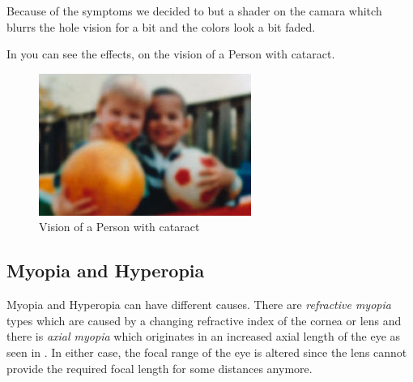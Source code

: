 \documentclass{sig-alternate-05-2015}
\begin{document}
Because of the symptoms we decided to but a shader on the camara whitch blurrs the hole vision for a bit and the colors look a bit faded.

In  you can see the effects, on the vision of a Person with cataract.

\begin{figure}
    \centering
    \includegraphics[width=\columnwidth]{cataractvision.png}
    \caption{Vision of a Person with cataract}
    \label{fig:cataract}
\end{figure}

\subsection{Myopia and Hyperopia}

Myopia and Hyperopia can have different causes. There are \emph{refractive myopia} types which are caused by a changing refractive index of the cornea or lens and there is \emph{axial myopia} which originates in an increased axial length of the eye as seen in .
In either case, the focal range of the eye is altered since the lens cannot provide the required focal length for some distances anymore.
\end{document}

